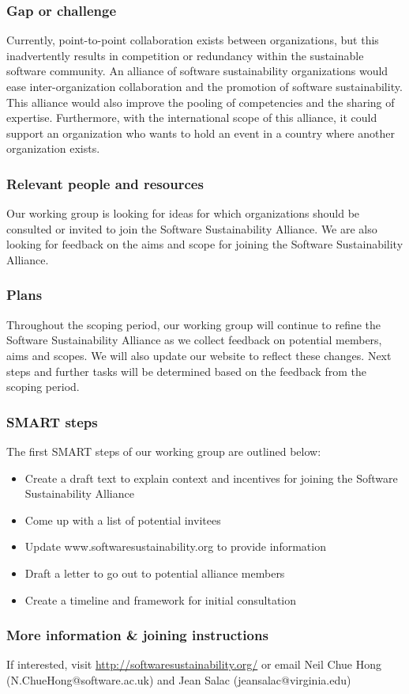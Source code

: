 \subsubsection{Gap or challenge}

Currently, point-to-point collaboration exists between organizations, but this inadvertently results in competition or redundancy within the sustainable software community. An alliance of software sustainability organizations would ease inter-organization collaboration and the promotion of software sustainability. This alliance would also improve the pooling of competencies and the sharing of expertise. Furthermore, with the international scope of this alliance, it could support an organization who wants to hold an event in a country where another organization exists.

\subsubsection{Relevant people and resources}

Our working group is looking for ideas for which organizations should be consulted or invited to join the Software Sustainability Alliance. We are also looking for feedback on the aims and scope for joining the Software Sustainability Alliance.

\subsubsection{Plans}

Throughout the scoping period, our working group will continue to refine the Software Sustainability Alliance as we collect feedback on potential members, aims and scopes. We will also update our website to reflect these changes. Next steps and further tasks will be determined based on the feedback from the scoping period.

\subsubsection{SMART steps}

The first SMART steps of our working group are outlined below:
\begin{itemize}
\item Create a draft text to explain context and incentives for joining the Software Sustainability Alliance
\item Come up with a list of potential invitees
\item Update www.softwaresustainability.org to provide information
\item Draft a letter to go out to potential alliance members
\item Create a timeline and framework for initial consultation
\end{itemize}

\subsubsection{More information \& joining instructions}

If interested, visit \url{http://softwaresustainability.org/} or email Neil Chue Hong (N.ChueHong@software.ac.uk) and Jean Salac (jeansalac@virginia.edu)
